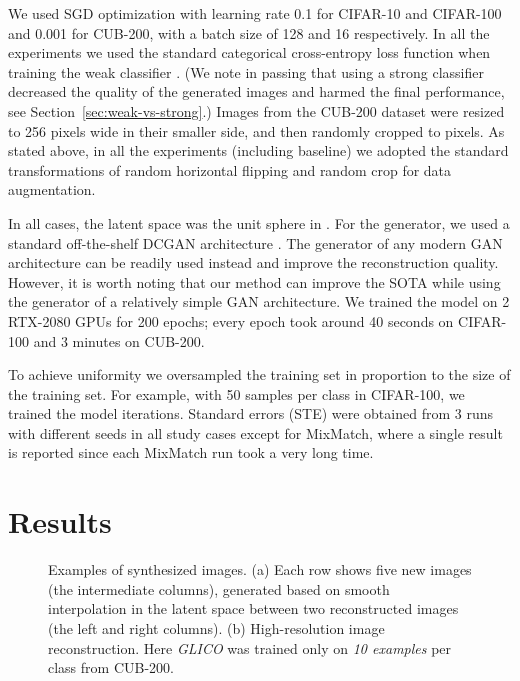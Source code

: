 \documentclass[a4paper,conference]{IEEEtran}
\begin{document}
We used SGD optimization with learning rate 0.1 for CIFAR-10 and CIFAR-100 and 0.001 for CUB-200, with a batch size of 128 and 16 respectively. In all the experiments we used the standard categorical cross-entropy loss function when training the weak classifier . (We note in passing that using a strong classifier decreased the quality of the generated images and harmed the final performance, see Section~\ref{sec:weak-vs-strong}.) Images from the CUB-200 dataset were resized to 256 pixels wide in their smaller side, and then randomly cropped to  pixels. As stated above, in all the experiments (including baseline) we adopted the standard transformations of random horizontal flipping and random crop for data augmentation. 

In all cases, the latent space  was the unit sphere in . For the generator, we used a standard off-the-shelf DCGAN architecture \cite{radford2015unsupervised}. The generator of any modern GAN architecture can be readily used instead and improve the reconstruction quality. However, it is worth noting that our method can improve the SOTA while using the generator of a relatively simple GAN architecture. We trained the model on 2  RTX-2080 GPUs for 200 epochs; every epoch took around 40 seconds on CIFAR-100 and 3 minutes on CUB-200.
		
To achieve uniformity we oversampled the training set in proportion to the size of the training set. For example, with 50 samples per class in CIFAR-100, we trained the model  iterations. Standard errors (STE) were obtained from 3 runs with different seeds in all study cases except for MixMatch, where a single result is reported since each MixMatch run took a very long time.
		

\section{Results}
\label{sec:results}


\begin{figure}[htbp]
\centering
	\qquad

		
				
	\caption{Examples of synthesized images. (a) Each row shows five new images (the intermediate columns), generated based on smooth interpolation in the latent space between two reconstructed images (the left and right columns).
		(b) High-resolution image reconstruction. Here \textit{GLICO} was trained only on \textit{10 examples} per class from CUB-200. \label{fig: cub_and_cifar_slerp}}


			
	\vskip -0.2in
\end{figure}
\end{document}
